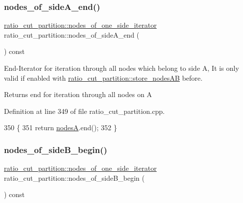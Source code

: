 \subsubsection{\texorpdfstring{nodes\+\_\+of\+\_\+side\+A\+\_\+end()}{nodes\_of\_sideA\_end()}}
{\footnotesize\ttfamily \mbox{\hyperlink{classratio__cut__partition_af438a591f6559b479bf40e9ac9cfcf0e}{ratio\+\_\+cut\+\_\+partition\+::nodes\+\_\+of\+\_\+one\+\_\+side\+\_\+iterator}} ratio\+\_\+cut\+\_\+partition\+::nodes\+\_\+of\+\_\+side\+A\+\_\+end (\begin{DoxyParamCaption}{ }\end{DoxyParamCaption}) const}

End-\/\+Iterator for iteration through all nodes which belong to side {\ttfamily A}, It is only valid if enabled with \mbox{\hyperlink{classratio__cut__partition_af0efdeab02cb235df47e2339c196051f}{ratio\+\_\+cut\+\_\+partition\+::store\+\_\+nodes\+AB}} before.

\begin{DoxyReturn}{Returns}
end for iteration through all nodes on {\ttfamily A} 
\end{DoxyReturn}


Definition at line 349 of file ratio\+\_\+cut\+\_\+partition.\+cpp.


\begin{DoxyCode}
350 \{
351     \textcolor{keywordflow}{return} \mbox{\hyperlink{classratio__cut__partition_a871cc6bf77000205fec8ab6d3a28fc28}{nodesA}}.end();
352 \}
\end{DoxyCode}
\mbox{\label{classratio__cut__partition_ae36c08387ff6eae1236076cdbabf4fa5}} 
\subsubsection{\texorpdfstring{nodes\+\_\+of\+\_\+side\+B\+\_\+begin()}{nodes\_of\_sideB\_begin()}}
{\footnotesize\ttfamily \mbox{\hyperlink{classratio__cut__partition_af438a591f6559b479bf40e9ac9cfcf0e}{ratio\+\_\+cut\+\_\+partition\+::nodes\+\_\+of\+\_\+one\+\_\+side\+\_\+iterator}} ratio\+\_\+cut\+\_\+partition\+::nodes\+\_\+of\+\_\+side\+B\+\_\+begin (\begin{DoxyParamCaption}{ }\end{DoxyParamCaption}) const}

